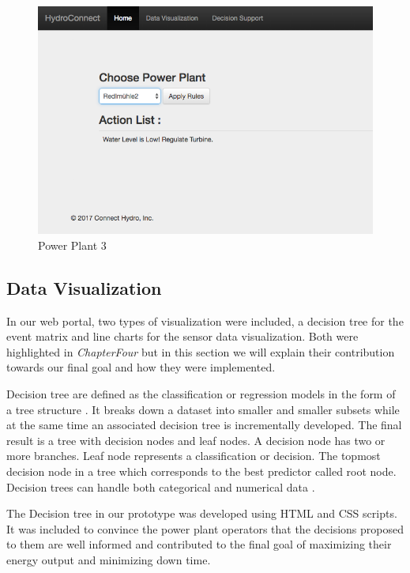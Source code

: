 \begin{figure}[H]
\centering
\includegraphics[scale=0.58]{Images/Screen3.png}
\caption[Power Plant 3]{Power Plant 3}
\end{figure}
\subsection{Data Visualization}
\label{subsec:DataVisualization}
In our web portal, two types of visualization were included, a decision tree for the event matrix and line charts for the sensor data visualization. Both were highlighted in \textit{ChapterFour} but in this section we will explain their contribution towards our final goal and how they were implemented.

Decision tree are defined as the classification or regression models in the form of a tree structure \cite{DecisionTree}. It breaks down a dataset into smaller and smaller subsets while at the same time an associated decision tree is incrementally developed. The final result is a tree with decision nodes and leaf nodes. A decision node has two or more branches. Leaf node represents a classification or decision. The topmost decision node in a tree which corresponds to the best predictor called root node. Decision trees can handle both categorical and numerical data \cite{DecisionTree}. 

The Decision tree in our prototype was developed using HTML and CSS scripts. It was included to convince the power plant operators that the decisions proposed to them are well informed and contributed to the final goal of maximizing their energy output and minimizing down time.

